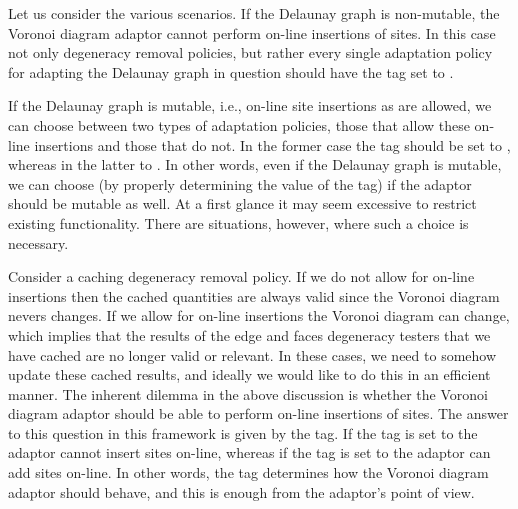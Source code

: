 Let us consider the various scenarios. If the Delaunay graph is
non-mutable, the Voronoi diagram adaptor cannot perform on-line
insertions of sites. In this case not only degeneracy removal
policies, but rather every single adaptation policy for
adapting the Delaunay graph in question should have the
 tag set to .

If the Delaunay graph is mutable, i.e., on-line site insertions as are
allowed, we can choose between two types of adaptation policies, those
that allow these on-line insertions and those that do not. In the
former case the  tag should be set to
, whereas in the latter to
. In other words, even if the Delaunay graph is
mutable, we can choose (by properly determining the value of the
 tag) if the adaptor should be mutable as well. At a
first glance it may seem excessive to restrict existing
functionality. There are situations, however, where such a choice is
necessary.

Consider a caching degeneracy removal policy. If we do not allow for
on-line insertions then the cached quantities are always valid since
the Voronoi diagram nevers changes. If we allow for on-line insertions
the Voronoi diagram can change, which implies that the results of the edge
and faces degeneracy testers that we have cached are no longer valid
or relevant. In these cases, we need to somehow update these cached
results, and ideally we would like to do this in an efficient manner.
%
The inherent dilemma in the above discussion is whether the Voronoi
diagram adaptor should be able to perform on-line insertions of
sites. The answer to this question in this framework is given by the
 tag. If the tag is set to  the
adaptor cannot insert sites on-line, whereas if the tag is set to
 the adaptor can add sites on-line. In other
words, the  tag determines how the Voronoi diagram
adaptor should behave, and this is enough from the adaptor's point of
view.

